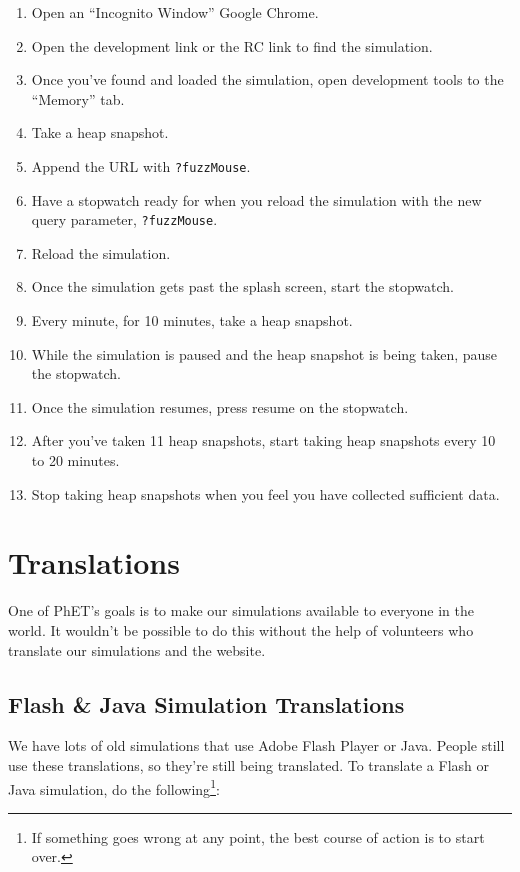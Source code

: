 \documentclass[titlepage]{article}
\begin{document}
		\begin{enumerate}
			\item Open an ``Incognito Window'' Google Chrome.
			\item Open the development link or the RC link to find the simulation.
			\item Once you've found and loaded the simulation, open development tools to the ``Memory'' tab.
			\item Take a heap snapshot.
			\item Append the URL with \verb|?fuzzMouse|.
			\item Have a stopwatch ready for when you reload the simulation with the new query parameter, \verb|?fuzzMouse|.
			\item Reload the simulation.
			\item Once the simulation gets past the splash screen, start the stopwatch.
			\item Every minute, for 10 minutes, take a heap snapshot.
			\item While the simulation is paused and the heap snapshot is being taken, pause the stopwatch.
			\item Once the simulation resumes, press resume on the stopwatch.
			\item After you've taken 11 heap snapshots, start taking heap snapshots every 10 to 20 minutes.
			\item Stop taking heap snapshots when you feel you have collected sufficient data.
		\end{enumerate}

\pagebreak


\section{Translations}

One of PhET's goals is to make our simulations available to everyone in the world. It wouldn't be possible to do this without the help of volunteers who translate our simulations and the website.

	\subsection{Flash \& Java Simulation Translations}

We have lots of old simulations that use Adobe Flash Player or Java. People still use these translations, so they're still being translated. To translate a Flash or Java simulation, do the following\footnote{If something goes wrong at any point, the best course of action is to start over.}:
\end{document}

